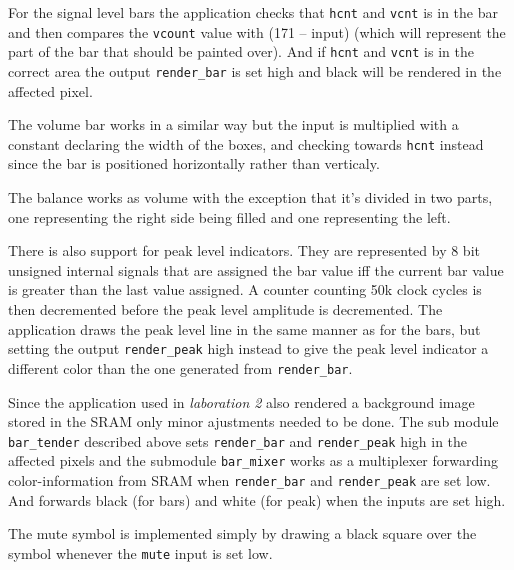For the signal level bars the application checks that \verb+hcnt+ and
\verb+vcnt+ is in the bar and then compares the \verb+vcount+ value with
(171 -- input)
(which will represent the part of the bar that should be
painted over). And if \verb+hcnt+ and \verb+vcnt+ is in the correct
area the output \verb+render_bar+ is set high and black will be rendered in
the affected pixel.

The volume bar works in a similar way but the input is multiplied with
a constant declaring the width of the boxes, and checking towards
\verb+hcnt+ instead since the bar is positioned horizontally rather
than verticaly.

The balance works as volume with the exception that it's divided in two
parts, one representing the right side being filled and one
representing the left.

There is also support for peak level indicators. They are represented
by 8 bit unsigned internal signals that are assigned the bar value iff
the current bar value is greater than the last value assigned. A
counter counting 50k clock cycles is then decremented before the peak
level amplitude is decremented. The application draws the peak level
line in the same manner as for the bars, but setting the output
\verb+render_peak+ high instead to give the peak level indicator a
different color than the one generated from \verb+render_bar+.

Since the application used in \emph{laboration 2} also rendered a background image
stored in the SRAM only minor ajustments needed to be done. The
sub module \verb+bar_tender+ described above sets \verb+render_bar+ and
\verb+render_peak+ high in the affected pixels and the submodule
\verb+bar_mixer+ works as a multiplexer forwarding color-information
from SRAM when \verb+render_bar+ and \verb+render_peak+ are set
low. And forwards black (for bars) and white (for peak) when the
inputs are set high.

The mute symbol is implemented simply by drawing a black square over
the symbol whenever the \verb+mute+ input is set low.
 
